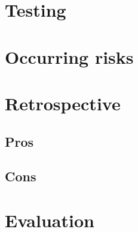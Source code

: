 \section{Testing}
\section{Occurring risks}
\section{Retrospective}
\subsection{Pros}
\subsection{Cons}
\section{Evaluation}